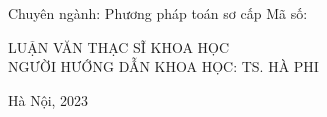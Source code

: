 \vspace{0.6cm}
\indexspace Chuyên ngành: Phương pháp toán sơ cấp
\vspace{-0.6cm}
\indexspace Mã số: \qquad \quad{}\\
\vspace{0.5cm}
\begin{center}
LUẬN VĂN THẠC SĨ KHOA HỌC
\vspace{1.5cm}
\\NGƯỜI HƯỚNG DẪN KHOA HỌC: TS. HÀ PHI
\end{center}
\vspace{2.2cm}
\begin{center}
 \fontsize{14pt}{0pt}\selectfont Hà Nội, 2023
\end{center}
\cleardoublepage
